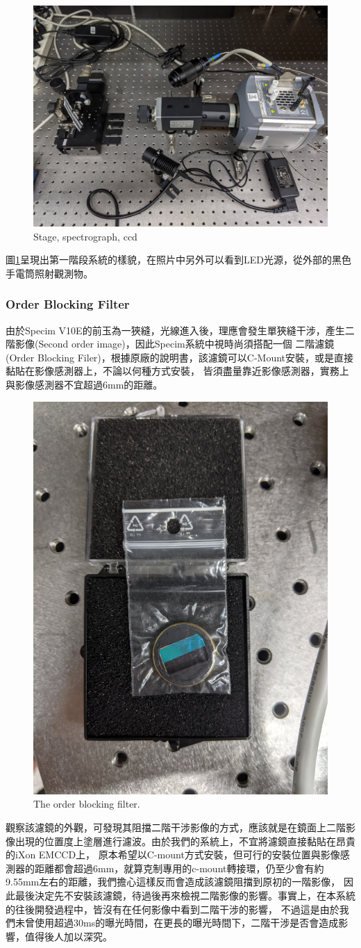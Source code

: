 \documentclass[12pt]{article}
\begin{document}
    \begin{figure}[t]
        \centering
        \includegraphics[width=0.65\linewidth]{PXL_20210723_094307842.jpg}
        \caption{Stage, spectrograph, ccd}
        \label{figure: 1 stage setup}
    \end{figure}
    
    圖\ref{figure: 1 stage setup}呈現出第一階段系統的樣貌，在照片中另外可以看到LED光源，從外部的黑色手電筒照射觀測物。
    \subsubsection{Order Blocking Filter}
    由於Specim V10E的前玉為一狹縫，光線進入後，理應會發生單狹縫干涉，產生二階影像(Second order image)，因此Specim系統中視時尚須搭配一個
    二階濾鏡(Order Blocking Filer)，根據原廠的說明書，該濾鏡可以C-Mount安裝，或是直接黏貼在影像感測器上，不論以何種方式安裝，
    皆須盡量靠近影像感測器，實務上與影像感測器不宜超過6mm的距離\cite{manual}。
    \begin{figure}[t]
        \centering
        \includegraphics[width=0.5\linewidth]{PXL_20210723_094341395.jpg}
        \caption{The order blocking filter.}
        \label{figure: obf}
    \end{figure}
    觀察該濾鏡的外觀，可發現其阻擋二階干涉影像的方式，應該就是在鏡面上二階影像出現的位置度上塗層進行濾波。由於我們的系統上，不宜將濾鏡直接黏貼在昂貴的iXon EMCCD上，
    原本希望以C-mount方式安裝，但可行的安裝位置與影像感測器的距離都會超過6mm，就算克制專用的c-mount轉接環，仍至少會有約9.55mm左右的距離，我們擔心這樣反而會造成該濾鏡阻擋到原初的一階影像，
    因此最後決定先不安裝該濾鏡，待過後再來檢視二階影像的影響。事實上，在本系統的往後開發過程中，皆沒有在任何影像中看到二階干涉的影響，
    不過這是由於我們未曾使用超過30ms的曝光時間，在更長的曝光時間下，二階干涉是否會造成影響，值得後人加以深究。
\end{document}
